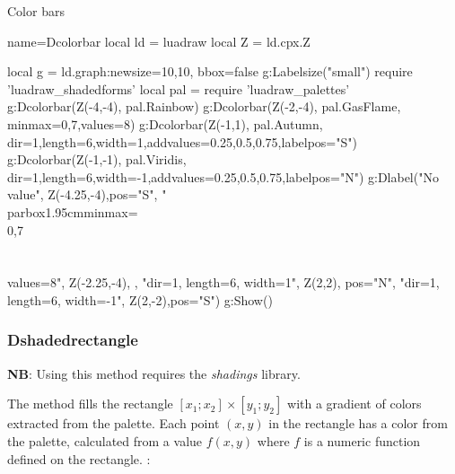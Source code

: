 \begin{demo}{Color bars}
\begin{luadraw}{name=Dcolorbar}
local ld = luadraw
local Z = ld.cpx.Z

local g = ld.graph:new{size={10,10}, bbox=false}
g:Labelsize("small")
require 'luadraw_shadedforms'
local pal = require 'luadraw_palettes'
g:Dcolorbar(Z(-4,-4), pal.Rainbow)
g:Dcolorbar(Z(-2,-4), pal.GasFlame, {minmax={0,7},values=8})
g:Dcolorbar(Z(-1,1), pal.Autumn, {dir=1,length=6,width=1,addvalues={0.25,0.5,0.75},labelpos="S"})
g:Dcolorbar(Z(-1,-1), pal.Viridis, {dir=1,length=6,width=-1,addvalues={0.25,0.5,0.75},labelpos="N"})
g:Dlabel("No value", Z(-4.25,-4),{pos="S"},
    "\\parbox{1.95cm}{minmax=\\{0,7\\}\\\\values=8}", Z(-2.25,-4), {},
    "dir=1, length=6, width=1", Z(2,2), {pos="N"},
    "dir=1, length=6, width=-1", Z(2,-2),{pos="S"})
g:Show()
\end{luadraw}
\end{demo}

\subsubsection{Dshadedrectangle}

\noindent\textbf{NB}: Using this method requires the \emph{shadings} library.

The  method fills the rectangle $[x_1;x_2]\times [y_1;y_2]$ with a gradient of colors extracted from the  palette. Each point $(x,y)$ in the rectangle has a color from the palette, calculated from a value $f(x,y)$ where $f$ is a numeric function defined on the rectangle. \writeoptions:


